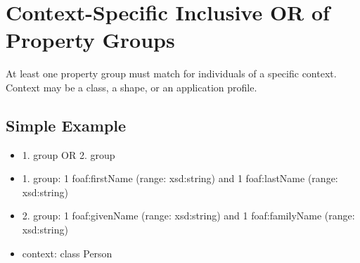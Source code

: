\documentclass{llncs}
\begin{document}
%
%
%
%

\section{Context-Specific Inclusive OR of Property Groups}

At least one property group must match for individuals of a specific context. 
Context may be a class, a shape, or an application profile.

\subsection{Simple Example}

\begin{itemize}
  \item 1. group OR 2. group
	\item 1. group: 1 foaf:firstName (range: xsd:string) and 1 foaf:lastName (range: xsd:string)
	\item 2. group: 1 foaf:givenName (range: xsd:string) and 1 foaf:familyName (range: xsd:string)
	\item context: class Person
\end{itemize}
\end{document}
